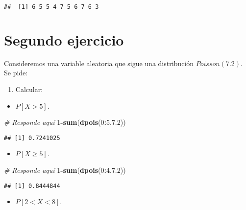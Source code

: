 \documentclass[
]{article}
\newenvironment{Shaded}{\begin{snugshade}}{\end{snugshade}}
\newcommand{\CommentTok}[1]{\textcolor[rgb]{0.56,0.35,0.01}{\textit{#1}}}
\newcommand{\DecValTok}[1]{\textcolor[rgb]{0.00,0.00,0.81}{#1}}
\newcommand{\FloatTok}[1]{\textcolor[rgb]{0.00,0.00,0.81}{#1}}
\newcommand{\KeywordTok}[1]{\textcolor[rgb]{0.13,0.29,0.53}{\textbf{#1}}}
\newcommand{\NormalTok}[1]{#1}
\newcommand{\OperatorTok}[1]{\textcolor[rgb]{0.81,0.36,0.00}{\textbf{#1}}}
\providecommand{\tightlist}{%
  \setlength{\itemsep}{0pt}\setlength{\parskip}{0pt}}
\begin{document}
\begin{verbatim}
##  [1] 6 5 5 4 7 5 6 7 6 3
\end{verbatim}

\hypertarget{segundo-ejercicio}{%
\section{Segundo ejercicio}\label{segundo-ejercicio}}

Consideremos una variable aleatoria que sigue una distribución
\(Poisson(7.2)\). Se pide:

\begin{enumerate}
\def\labelenumi{\arabic{enumi}.}
\tightlist
\item
  Calcular:
\end{enumerate}

\begin{itemize}
\tightlist
\item
  \(P[X > 5]\).
\end{itemize}

\begin{Shaded}
\begin{Highlighting}[]
\CommentTok{# Responde aquí}
\DecValTok{1}\OperatorTok{-}\KeywordTok{sum}\NormalTok{(}\KeywordTok{dpois}\NormalTok{(}\DecValTok{0}\OperatorTok{:}\DecValTok{5}\NormalTok{,}\FloatTok{7.2}\NormalTok{))}
\end{Highlighting}
\end{Shaded}

\begin{verbatim}
## [1] 0.7241025
\end{verbatim}

\begin{itemize}
\tightlist
\item
  \(P[X \geq 5]\).
\end{itemize}

\begin{Shaded}
\begin{Highlighting}[]
\CommentTok{# Responde aquí}
\DecValTok{1}\OperatorTok{-}\KeywordTok{sum}\NormalTok{(}\KeywordTok{dpois}\NormalTok{(}\DecValTok{0}\OperatorTok{:}\DecValTok{4}\NormalTok{,}\FloatTok{7.2}\NormalTok{))}
\end{Highlighting}
\end{Shaded}

\begin{verbatim}
## [1] 0.8444844
\end{verbatim}

\begin{itemize}
\tightlist
\item
  \(P[2 < X < 8]\).
\end{itemize}
\end{document}
